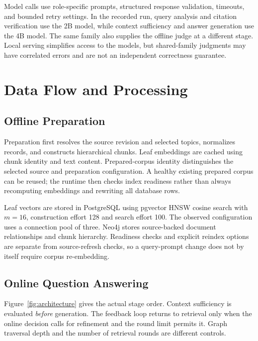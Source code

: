 Model calls use role-specific prompts, structured response validation, timeouts, and bounded retry settings. In the recorded run, query analysis and citation verification use the 2B model, while context sufficiency and answer generation use the 4B model. The same family also supplies the offline judge at a different stage. Local serving simplifies access to the models, but shared-family judgments may have correlated errors and are not an independent correctness guarantee.

\section{Data Flow and Processing}
\subsection{Offline Preparation}
Preparation first resolves the source revision and selected topics, normalizes records, and constructs hierarchical chunks. Leaf embeddings are cached using chunk identity and text content. Prepared-corpus identity distinguishes the selected source and preparation configuration. A healthy existing prepared corpus can be reused; the runtime then checks index readiness rather than always recomputing embeddings and rewriting all database rows.

Leaf vectors are stored in PostgreSQL using pgvector HNSW cosine search with $m=16$, construction effort 128 and search effort 100. The observed configuration uses a connection pool of three. Neo4j stores source-backed document relationships and chunk hierarchy. Readiness checks and explicit reindex options are separate from source-refresh checks, so a query-prompt change does not by itself require corpus re-embedding.

\subsection{Online Question Answering}
Figure~\ref{fig:architecture} gives the actual stage order. Context sufficiency is evaluated \emph{before} generation. The feedback loop returns to retrieval only when the online decision calls for refinement and the round limit permits it. Graph traversal depth and the number of retrieval rounds are different controls.

